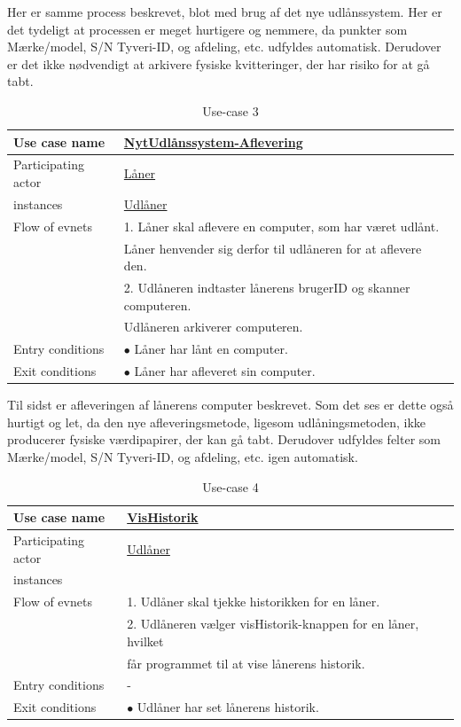 \documentclass[a4paper]{article}
\begin{document}
Her er samme process beskrevet, blot med brug af det nye udlånssystem. Her er det tydeligt at processen er meget hurtigere og nemmere, da punkter som Mærke/model, S/N Tyveri-ID, og afdeling, etc. udfyldes automatisk. Derudover er det ikke nødvendigt at arkivere fysiske kvitteringer, der har risiko for at gå tabt.
\newpage
\begin{table}[h]
\caption{Use-case 3}
\begin{tabular}{ll}
Use case name               & \underline{NytUdlånssystem-Aflevering} \\ \hline
Participating actor           & \underline{Låner} \\
instances                     & \underline{Udlåner}\\ \hline
Flow of evnets                & 1. Låner skal aflevere en computer, som har været udlånt.
\\& Låner henvender sig derfor til udlåneren for at aflevere den.
\\& 2. Udlåneren indtaster lånerens brugerID og skanner computeren.
\\& Udlåneren arkiverer computeren. \\ \hline
Entry conditions & $\bullet$ Låner har lånt en computer.\\ \hline
Exit conditions  & $\bullet$ Låner har afleveret sin computer.
\end{tabular}
\end{table}
Til sidst er afleveringen af lånerens computer beskrevet. Som det ses er dette også hurtigt og let, da den nye afleveringsmetode, ligesom udlåningsmetoden, ikke producerer fysiske værdipapirer, der kan gå tabt. Derudover udfyldes felter som Mærke/model, S/N Tyveri-ID, og afdeling, etc. igen automatisk. \\
\begin{table}[h]
\caption{Use-case 4}
\begin{tabular}{ll}
Use case name               & \underline{VisHistorik} \\ \hline
Participating actor           & \underline{Udlåner} \\
instances\\ \hline
Flow of evnets                & 1. Udlåner skal tjekke historikken for en låner.
                            \\& 2. Udlåneren vælger visHistorik-knappen for en låner, hvilket
                            \\& får programmet til at vise lånerens historik.  \\ \hline
Entry conditions & - \\ \hline
Exit conditions  & $\bullet$ Udlåner har set lånerens historik.
\end{tabular}
\end{table}
\end{document}
